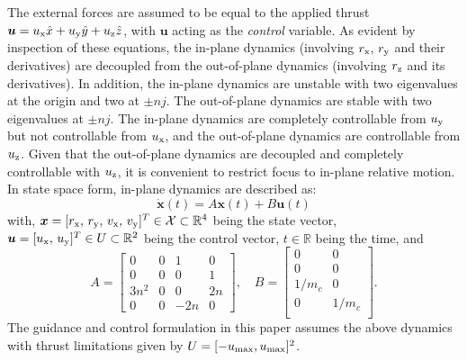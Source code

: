 \documentclass[twocolumn,letterpaper]{IEEEAerospaceCLS}  %
\theoremstyle{definition}
\begin{document}

The external forces are assumed to be equal to the applied thrust 
$\boldsymbol{u}=u_{\rm x}\hat{x}+u_{\rm y}\hat{y}+u_{\rm z}\hat{z}$, with $\boldsymbol{u}$
acting as the \emph{control} variable.
As evident by inspection of these equations, the in-plane dynamics (involving $r_{\rm x},\, r_{\rm y}$ and their derivatives) are decoupled from the out-of-plane dynamics (involving $r_{\rm z}$ and its derivatives). In addition, the in-plane dynamics are unstable with two eigenvalues at the origin and two at $\pm n j$. The out-of-plane dynamics are stable with two eigenvalues at $\pm n j$. The in-plane dynamics are completely controllable from $u_{\rm y}$ but not controllable from $u_{\rm x}$, and the out-of-plane dynamics are controllable from $u_{\rm z}$. 
Given that the out-of-plane dynamics are decoupled and completely controllable with $u_{\rm z}$, it is convenient to restrict focus to in-plane relative motion.
In state space form, {in-plane dynamics} are described as:
\begin{equation}\label{eq:LinearCWH} 
\dot{\boldsymbol{x}}(t) = A \boldsymbol{x}(t) + B \boldsymbol{u}(t)
\end{equation}
with, $\boldsymbol{x}= [r_{\rm x}, \, r_{\rm y}, \, v_{\rm x}, \, v_{\rm y}]^T \in {\mathcal{X}} \subset {\mathbb R}^4$ being the state vector, $\boldsymbol{u}=[u_{\rm x},\, u_{\rm y}]^T \in U \subset {\mathbb R}^2$ being the control vector, $t\in{\mathbb R}$ being the time, and 
\begin{equation} \label{eq: state and control}
 A =
\begin{bmatrix} 
0 & 0 & 1 & 0 \\
0 & 0 & 0 & 1 \\
3n^2& 0 & 0 & 2n \\
0 & 0 & -2n & 0 
\end{bmatrix} , 
\quad 
B = 
\begin{bmatrix}
0 & 0 \\
0 & 0 \\
1/m_c & 0 \\
0 &1/m_c \\
\end{bmatrix} .
\end{equation}
The guidance and control formulation in this paper assumes the above dynamics with thrust limitations given by $U=[-u_{\rm max}, u_{\rm max}]^2$. 

\end{document}
